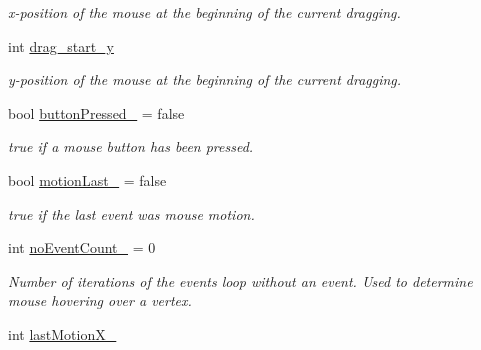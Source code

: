\begin{DoxyCompactItemize}
\begin{DoxyCompactList}\small\item\em x-\/position of the mouse at the beginning of the current dragging. \end{DoxyCompactList}\item 
int \hyperlink{structui_1_1Visualizer_ad8a1a66a7efc373754a6471d435b5631}{drag\+\_\+start\+\_\+y}\hypertarget{structui_1_1Visualizer_ad8a1a66a7efc373754a6471d435b5631}{}\label{structui_1_1Visualizer_ad8a1a66a7efc373754a6471d435b5631}

\begin{DoxyCompactList}\small\item\em y-\/position of the mouse at the beginning of the current dragging. \end{DoxyCompactList}\item 
bool \hyperlink{structui_1_1Visualizer_ac549be715fc87b9aab18a4758d7fad3d}{button\+Pressed\+\_\+} = false\hypertarget{structui_1_1Visualizer_ac549be715fc87b9aab18a4758d7fad3d}{}\label{structui_1_1Visualizer_ac549be715fc87b9aab18a4758d7fad3d}

\begin{DoxyCompactList}\small\item\em {\ttfamily true} if a mouse button has been pressed. \end{DoxyCompactList}\item 
bool \hyperlink{structui_1_1Visualizer_afd3e874599d75b1400bcb09dd4f0abce}{motion\+Last\+\_\+} = false\hypertarget{structui_1_1Visualizer_afd3e874599d75b1400bcb09dd4f0abce}{}\label{structui_1_1Visualizer_afd3e874599d75b1400bcb09dd4f0abce}

\begin{DoxyCompactList}\small\item\em {\ttfamily true} if the last event was mouse motion. \end{DoxyCompactList}\item 
int \hyperlink{structui_1_1Visualizer_a45657259a0a815d1ff9ccc220c5e4179}{no\+Event\+Count\+\_\+} = 0\hypertarget{structui_1_1Visualizer_a45657259a0a815d1ff9ccc220c5e4179}{}\label{structui_1_1Visualizer_a45657259a0a815d1ff9ccc220c5e4179}

\begin{DoxyCompactList}\small\item\em Number of iterations of the events loop without an event. Used to determine mouse hovering over a vertex. \end{DoxyCompactList}\item 
int \hyperlink{structui_1_1Visualizer_ab6045553b88ab089824f59a0bcad6be4}{last\+Motion\+X\+\_\+}\hypertarget{structui_1_1Visualizer_ab6045553b88ab089824f59a0bcad6be4}{}\label{structui_1_1Visualizer_ab6045553b88ab089824f59a0bcad6be4}


\end{DoxyCompactItemize}
